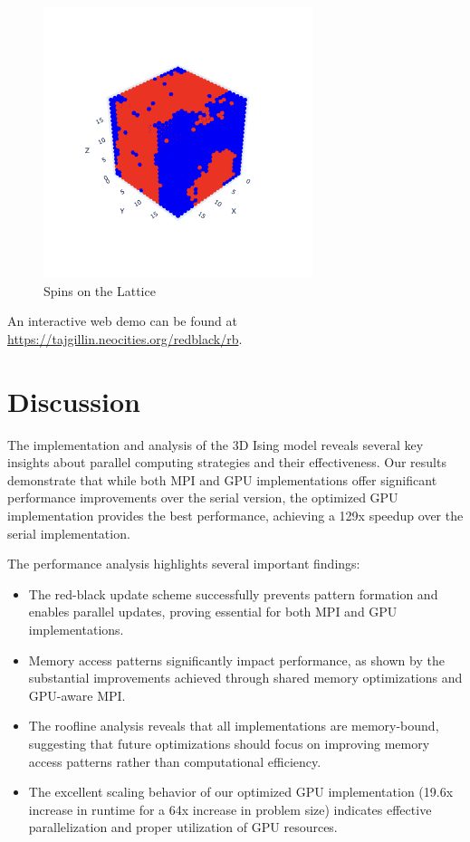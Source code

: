 \documentclass{article}
\begin{document}
\begin{figure}[H]
\centering
\includegraphics[width=0.7\textwidth]{lattice.png}
\caption{Spins on the Lattice}
\label{fig:spins}
\end{figure}

An interactive web demo can be found at \url{https://tajgillin.neocities.org/redblack/rb}.

\section{Discussion}
The implementation and analysis of the 3D Ising model reveals several key insights about parallel computing strategies and their effectiveness. Our results demonstrate that while both MPI and GPU implementations offer significant performance improvements over the serial version, the optimized GPU implementation provides the best performance, achieving a 129x speedup over the serial implementation.

The performance analysis highlights several important findings:

\begin{itemize}
    \item The red-black update scheme successfully prevents pattern formation and enables parallel updates, proving essential for both MPI and GPU implementations.
    
    \item Memory access patterns significantly impact performance, as shown by the substantial improvements achieved through shared memory optimizations and GPU-aware MPI.
    
    \item The roofline analysis reveals that all implementations are memory-bound, suggesting that future optimizations should focus on improving memory access patterns rather than computational efficiency.
    
    \item The excellent scaling behavior of our optimized GPU implementation (19.6x increase in runtime for a 64x increase in problem size) indicates effective parallelization and proper utilization of GPU resources.
\end{itemize}
\end{document}
